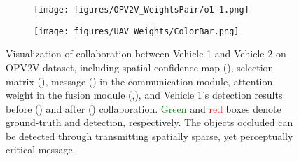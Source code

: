 \documentclass{article}
\begin{document}
\begin{figure}[!t]
\begin{subfigure}{0.22\linewidth}
    \texttt{[image: figures/OPV2V\_WeightsPair/o1-1.png]}
    \vspace{-5mm}
    \caption{}
    \label{fig:UAV_Detections}
  \end{subfigure}
  \begin{subfigure}{0.07\linewidth}
    \texttt{[image: figures/UAV\_Weights/ColorBar.png]}
    \end{subfigure}
\vspace{-2mm}
  \caption{Visualization of collaboration between Vehicle 1 and Vehicle 2 on OPV2V dataset, including spatial confidence map (), selection matrix (), message () in the communication module, attention weight in the fusion module (,), and Vehicle 1's detection results before () and after () collaboration. \textcolor{green}{Green} and \textcolor{red}{red} boxes denote ground-truth and detection, respectively. The objects occluded can be detected through transmitting spatially sparse, yet perceptually critical message. }
  \label{fig:OPV2V_Weights}
  \vspace{-4mm}
\end{figure}
\end{document}
